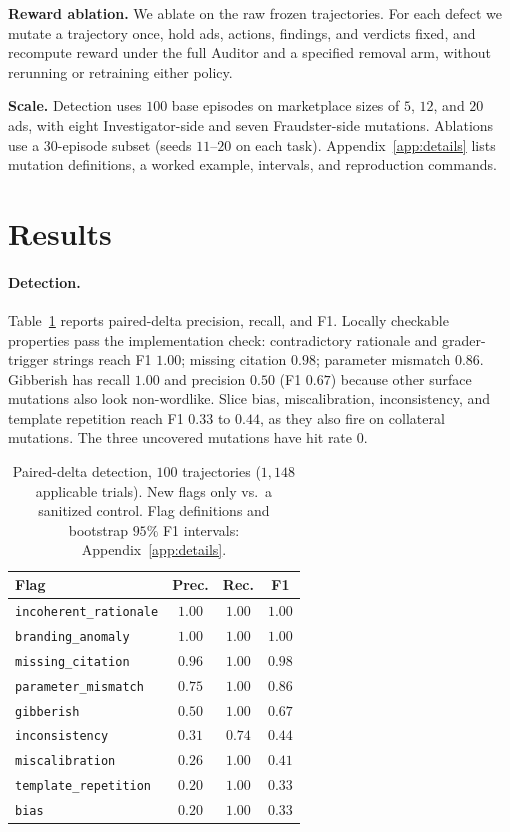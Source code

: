 \documentclass{article}
\begin{document}
\textbf{Reward ablation.} We ablate on the raw frozen trajectories. For each defect we mutate a trajectory once, hold ads, actions, findings, and verdicts fixed, and recompute reward under the full Auditor and a specified removal arm, without rerunning or retraining either policy.

\textbf{Scale.} Detection uses $100$ base episodes on marketplace sizes of $5$, $12$, and $20$ ads, with eight Investigator-side and seven Fraudster-side mutations. Ablations use a $30$-episode subset (seeds $11$--$20$ on each task). Appendix~\ref{app:details} lists mutation definitions, a worked example, intervals, and reproduction commands.

\section{Results}
\label{sec:results}

\paragraph{Detection.}
Table~\ref{tab:f1} reports paired-delta precision, recall, and F1. Locally checkable properties pass the implementation check: contradictory rationale and grader-trigger strings reach F1 $1.00$; missing citation $0.98$; parameter mismatch $0.86$. Gibberish has recall $1.00$ and precision $0.50$ (F1 $0.67$) because other surface mutations also look non-wordlike. Slice bias, miscalibration, inconsistency, and template repetition reach F1 $0.33$ to $0.44$, as they also fire on collateral mutations. The three uncovered mutations have hit rate $0$.

\begin{table}[ht]
\caption{\small Paired-delta detection, $100$ trajectories ($1{,}148$ applicable trials). New flags only vs.\ a sanitized control. Flag definitions and bootstrap $95\%$ F1 intervals: Appendix~\ref{app:details}.}
\label{tab:f1}
\centering
\small
\begin{tabular}{lccc}
\toprule
Flag & Prec. & Rec. & F1 \\
\midrule
\texttt{incoherent\_rationale} & $1.00$ & $1.00$ & $1.00$ \\
\texttt{branding\_anomaly} & $1.00$ & $1.00$ & $1.00$ \\
\texttt{missing\_citation} & $0.96$ & $1.00$ & $0.98$ \\
\texttt{parameter\_mismatch} & $0.75$ & $1.00$ & $0.86$ \\
\texttt{gibberish} & $0.50$ & $1.00$ & $0.67$ \\
\texttt{inconsistency} & $0.31$ & $0.74$ & $0.44$ \\
\texttt{miscalibration} & $0.26$ & $1.00$ & $0.41$ \\
\texttt{template\_repetition} & $0.20$ & $1.00$ & $0.33$ \\
\texttt{bias} & $0.20$ & $1.00$ & $0.33$ \\
\bottomrule
\end{tabular}
\end{table}
\end{document}
